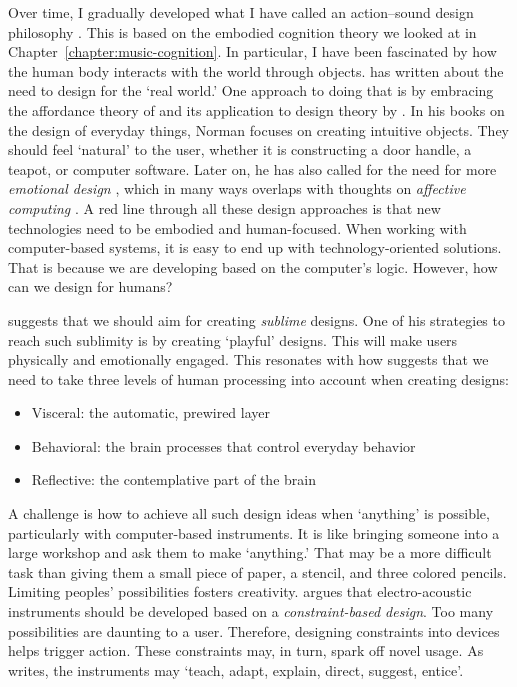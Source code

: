 Over time, I gradually developed what I have called an action--sound design philosophy \citep{jensenius_action-sound_2013}. This is based on the embodied cognition theory we looked at in Chapter~\ref{chapter:music-cognition}. In particular, I have been fascinated by how the human body interacts with the world through objects. \citet{papanek_design_1985} has written about the need to design for the `real world.' One approach to doing that is by embracing the affordance theory of \citet{gibson_theory_1977} and its application to design theory by \citet{norman_design_1990, norman_design_2013}. In his books on the design of everyday things, Norman focuses on creating intuitive objects. They should feel `natural' to the user, whether it is constructing a door handle, a teapot, or computer software.
Later on, he has also called for the need for more \emph{emotional design} \citep{norman_emotional_2004}, which in many ways overlaps with thoughts on \emph{affective computing} \citep{picard_affective_1997-1}. A red line through all these design approaches is that new technologies need to be embodied and human-focused. When working with computer-based systems, it is easy to end up with technology-oriented solutions. That is because we are developing based on the computer's logic. However, how can we design for humans?

\citet{wang_artful_2018} suggests that we should aim for creating \emph{sublime} designs. One of his strategies to reach such sublimity is by creating `playful' designs. This will make users physically and emotionally engaged. This resonates with how \citet{norman_emotional_2004} suggests that we need to take three levels of human processing into account when creating designs:

\begin{itemize}
\item Visceral: the automatic, prewired layer
\item Behavioral: the brain processes that control everyday behavior
\item Reflective: the contemplative part of the brain
\end{itemize}

A challenge is how to achieve all such design ideas when `anything' is possible, particularly with computer-based instruments. It is like bringing someone into a large workshop and ask them to make `anything.' That may be a more difficult task than giving them a small piece of paper, a stencil, and three colored pencils. Limiting peoples' possibilities fosters creativity.
\citet{magnusson_epistemic_2009} argues that electro-acoustic instruments should be developed based on a \emph{constraint-based design}. Too many possibilities are daunting to a user. Therefore, designing constraints into devices helps trigger action. These constraints may, in turn, spark off novel usage. As \citet{magnusson_ergomimesis_2018} writes, the instruments may `teach, adapt, explain, direct, suggest, entice'.

